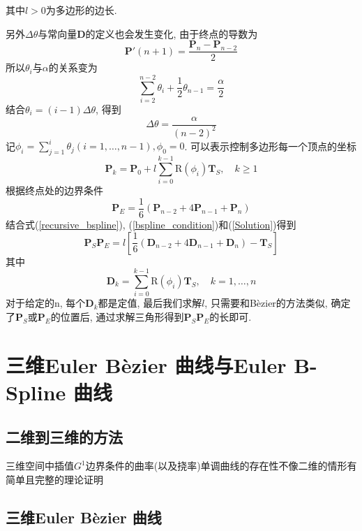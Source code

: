 \documentclass[utf8]{ctexart} %
\begin{document}
	 其中$l>0$为多边形的边长.\par 
	 另外$\Delta\theta$与常向量$\boldsymbol{D}$的定义也会发生变化, 由于终点的导数为
	 \begin{equation}
	 \boldsymbol{P}'(n+1) = \frac{\boldsymbol{P}_n-\boldsymbol{P}_{n-2}}2
	 \end{equation}
	 所以$\theta_i$与$\alpha$的关系变为
	 \begin{equation}
	 \sum_{i=2}^{n-2}\theta_i+\frac12\theta_{n-1}=\frac{\alpha}2
	 \end{equation}
	 结合$\theta_i=(i-1)\Delta\theta$, 得到
	 \begin{equation}
	 \Delta\theta = \frac{\alpha}{(n-2)^2}
	 \end{equation}
	 记$\phi_i=\sum_{j=1}^i\theta_j (i = 1,\dots,n-1), \phi_0 = 0$. 可以表示控制多边形每一个顶点的坐标
	 \begin{equation}\label{recursive_bspline}
	 \boldsymbol{P}_k = \boldsymbol{P}_0+l\sum_{i=0}^{k-1}\text{R}(\phi_i)\boldsymbol{T}_S,\quad k\geq1
	 \end{equation}
	 根据终点处的边界条件
	 \begin{equation}\label{bspline_condition}
	 \boldsymbol{P}_E = \frac{1}6(\boldsymbol{P}_{n-2}+4\boldsymbol{P}_{n-1}+\boldsymbol{P}_n)
	 \end{equation}
	结合式(\ref{recursive_bspline}), (\ref{bspline_condition})和(\ref{Solution})得到
	\begin{equation}
	\boldsymbol{P}_S\boldsymbol{P}_E=l[\frac16(\boldsymbol{D}_{n-2}+4\boldsymbol{D}_{n-1}+\boldsymbol{D}_n)-\boldsymbol{T}_S]
	\end{equation}
	其中\begin{equation}
	\boldsymbol{D}_k = \sum_{i=0}^{k-1}\text{R}(\phi_i)\boldsymbol{T}_S,\quad k=1,\dots,n
	\end{equation}
	对于给定的n, 每个$\boldsymbol{D}_k$都是定值, 最后我们求解$l$, 只需要和B\`ezier的方法类似, 确定了$\boldsymbol{P}_S$或$\boldsymbol{P}_E$的位置后, 通过求解三角形得到$\boldsymbol{P}_S\boldsymbol{P}_E$的长即可.
	 \section{三维Euler B\`{e}zier 曲线与Euler B-Spline 曲线}
	 \subsection{二维到三维的方法}
	 三维空间中插值$G^1$边界条件的曲率(以及挠率)单调曲线的存在性不像二维的情形有简单且完整的理论证明
	 \subsection{三维Euler B\`{e}zier 曲线}
\end{document}
